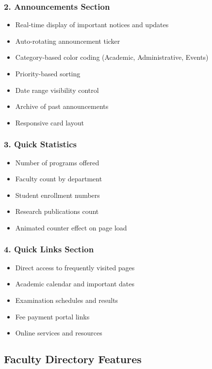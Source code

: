 \documentclass[12pt,a4paper]{report}
\begin{document}
\subsubsection*{2. Announcements Section}
\begin{itemize}
    \item Real-time display of important notices and updates
    \item Auto-rotating announcement ticker
    \item Category-based color coding (Academic, Administrative, Events)
    \item Priority-based sorting
    \item Date range visibility control
    \item Archive of past announcements
    \item Responsive card layout
\end{itemize}

\subsubsection*{3. Quick Statistics}
\begin{itemize}
    \item Number of programs offered
    \item Faculty count by department
    \item Student enrollment numbers
    \item Research publications count
    \item Animated counter effect on page load
\end{itemize}

\subsubsection*{4. Quick Links Section}
\begin{itemize}
    \item Direct access to frequently visited pages
    \item Academic calendar and important dates
    \item Examination schedules and results
    \item Fee payment portal links
    \item Online services and resources
\end{itemize}

\subsection{Faculty Directory Features}
\end{document}
